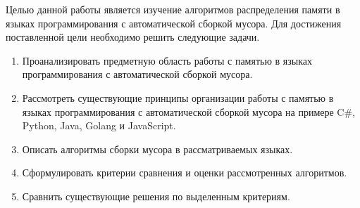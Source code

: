 Целью данной работы является изучение алгоритмов распределения памяти в языках программирования с автоматической сборкой мусора. Для достижения поставленной цели необходимо решить следующие задачи.

\begin{enumerate}[label*=\arabic*.]
	\item Проанализировать предметную область работы с памятью в языках программирования с автоматической сборкой мусора.
	\item Рассмотреть существующие принципы организации работы с памятью в языках программирования с автоматической сборкой мусора на примере C\#, Python, Java, Golang и JavaScript.
	\item Описать алгоритмы сборки мусора в рассматриваемых языках.
	\item Сформулировать критерии сравнения и оценки рассмотренных алгоритмов.
	\item Сравнить существующие решения по выделенным критериям. 
\end{enumerate}